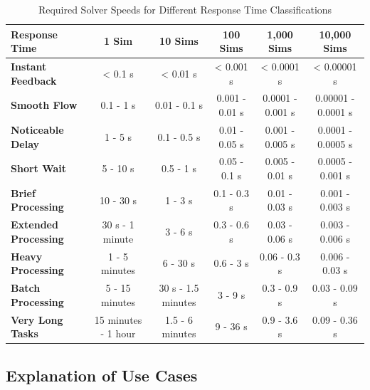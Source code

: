 \documentclass{article}
\begin{document}
\begin{landscape}
\begin{table}[h!]
    \centering
    \begin{tabular}{|l|c|c|c|c|c|}
    \hline
    \textbf{Response Time} & \textbf{1 Sim} & \textbf{10 Sims} & \textbf{100 Sims} & \textbf{1,000 Sims} & \textbf{10,000 Sims} \\ \hline
    \textbf{Instant Feedback} & < 0.1 s & < 0.01 s & < 0.001 s & < 0.0001 s & < 0.00001 s \\ \hline
    \textbf{Smooth Flow} & 0.1 - 1 s & 0.01 - 0.1 s & 0.001 - 0.01 s & 0.0001 - 0.001 s & 0.00001 - 0.0001 s \\ \hline
    \textbf{Noticeable Delay} & 1 - 5 s & 0.1 - 0.5 s & 0.01 - 0.05 s & 0.001 - 0.005 s & 0.0001 - 0.0005 s \\ \hline
    \textbf{Short Wait} & 5 - 10 s & 0.5 - 1 s & 0.05 - 0.1 s & 0.005 - 0.01 s & 0.0005 - 0.001 s \\ \hline
    \textbf{Brief Processing} & 10 - 30 s & 1 - 3 s & 0.1 - 0.3 s & 0.01 - 0.03 s & 0.001 - 0.003 s \\ \hline
    \textbf{Extended Processing} & 30 s - 1 minute & 3 - 6 s & 0.3 - 0.6 s & 0.03 - 0.06 s & 0.003 - 0.006 s \\ \hline
    \textbf{Heavy Processing} & 1 - 5 minutes & 6 - 30 s & 0.6 - 3 s & 0.06 - 0.3 s & 0.006 - 0.03 s \\ \hline
    \textbf{Batch Processing} & 5 - 15 minutes & 30 s - 1.5 minutes & 3 - 9 s & 0.3 - 0.9 s & 0.03 - 0.09 s \\ \hline
    \textbf{Very Long Tasks} & 15 minutes - 1 hour & 1.5 - 6 minutes & 9 - 36 s & 0.9 - 3.6 s & 0.09 - 0.36 s \\ \hline
    \end{tabular}
    \caption{Required Solver Speeds for Different Response Time Classifications}
\end{table}

\subsection{Explanation of Use Cases}


\end{landscape}
\end{document}
